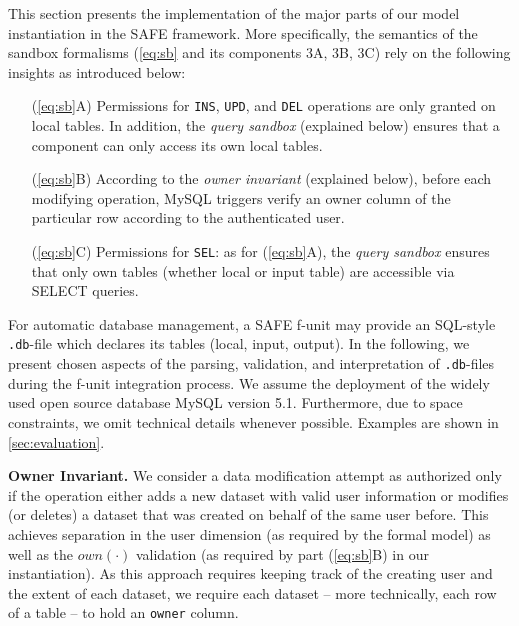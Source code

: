 \documentclass{src/acm_proc_article-sp} \else
\newcommand\myparagraph[1]{\medskip\noindent\textbf{#1.}}
\newcommand\SAFE{SAFE\xspace}
\begin{document}
This section presents the implementation of the major parts of our
model instantiation in the \SAFE framework. More specifically, the
semantics of the sandbox formalisms (\autoref{eq:sb} and its
components 3A, 3B, 3C) rely on the following insights as introduced
below:
\vspace{-\parskip}
\begin{itemize}
  \setlength\itemsep{0pt}

\item[(\ref{eq:sb}A)] \vspace{-1mm} Permissions for \texttt{INS}, \texttt{UPD}, and
\texttt{DEL} operations are only granted on local tables. In
addition, the \emph{query sandbox} (explained below) ensures that a
component can only access its own local tables.

\item[(\ref{eq:sb}B)] According to the \emph{owner invariant}
(explained below), before each modifying operation, MySQL triggers
verify an owner column of the particular row according to the
authenticated user.

\item[(\ref{eq:sb}C)] Permissions for \texttt{SEL}: as for
(\ref{eq:sb}A), the \emph{query sandbox} ensures that only own tables
(whether local or input table) are accessible via SELECT queries.

\end{itemize}
\vspace{-\parskip}
For automatic database management, a \SAFE f-unit may provide
an SQL-style \texttt{.db}-file which declares its tables (local,
input, output). In the following, we present
chosen aspects of the parsing, validation, and interpretation of
\texttt{.db}-files during the f-unit integration process.
We assume the deployment of the widely used open source database
MySQL version 5.1. Furthermore, due to space constraints, we omit
technical details whenever possible.
Examples are shown in \autoref{sec:evaluation}.


\myparagraph{Owner Invariant}
We consider a data modification attempt as authorized only if the
operation either adds a new dataset with valid user information or
modifies (or deletes) a dataset that was created on behalf of the
same user before. This achieves separation in the
user dimension (as required by the formal model) as well as the
$\mathit{own(\cdot)}$ validation (as required by part (\ref{eq:sb}B)
in our instantiation). As this approach requires keeping track of the
creating user and the extent of each dataset, we require each dataset
-- more technically, each row of a table -- to hold an \texttt{owner}
column.
\end{document}
